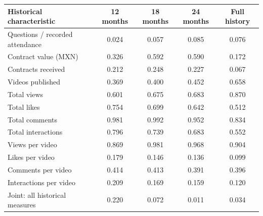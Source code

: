 \begingroup\small
\setlength{\tabcolsep}{3pt}
\renewcommand{\arraystretch}{1.25}
\noindent%
\begin{tabular*}{\linewidth}{@{\extracolsep{\fill}}lcccc@{}}
\toprule
Historical characteristic & 12 months & 18 months & 24 months & Full history \\
\midrule
Questions / recorded attendance & 0.024 & 0.057 & 0.085 & 0.076 \\
\addlinespace
Contract value (MXN) & 0.326 & 0.592 & 0.590 & 0.172 \\
Contracts received & 0.212 & 0.248 & 0.227 & 0.067 \\
\addlinespace
Videos published & 0.369 & 0.400 & 0.452 & 0.658 \\
Total views & 0.601 & 0.675 & 0.683 & 0.870 \\
Total likes & 0.754 & 0.699 & 0.642 & 0.512 \\
Total comments & 0.981 & 0.992 & 0.952 & 0.834 \\
Total interactions & 0.796 & 0.739 & 0.683 & 0.552 \\
Views per video & 0.869 & 0.981 & 0.968 & 0.904 \\
Likes per video & 0.179 & 0.146 & 0.136 & 0.099 \\
Comments per video & 0.414 & 0.413 & 0.391 & 0.396 \\
Interactions per video & 0.209 & 0.169 & 0.159 & 0.120 \\
\midrule
Joint: all historical measures & 0.220 & 0.072 & 0.011 & 0.034 \\
\bottomrule
\end{tabular*}\par\endgroup
